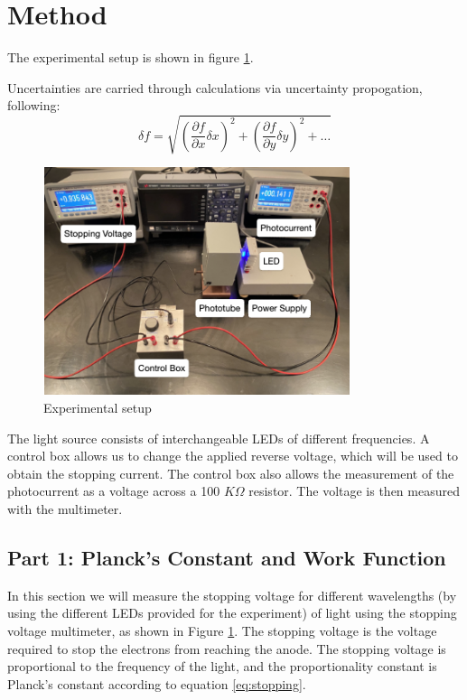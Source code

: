 \section{Method}

The experimental setup is shown in figure \ref{fig:setup}.

Uncertainties are carried through calculations via uncertainty propogation, following:
\begin{equation}
    \label{eq:uncertainty}
    \delta f = \sqrt{\left(\frac{\partial f}{\partial x}\delta x\right)^2 + \left(\frac{\partial f}{\partial y}\delta y\right)^2 + \ldots}
\end{equation}

\begin{figure}[H]
    \centering
    \includegraphics[width=0.8\textwidth]{method/setup.png}
    \caption{Experimental setup}
    \label{fig:setup}
\end{figure}

The light source consists of interchangeable LEDs of different frequencies. A control box allows us to change the applied reverse voltage, which will be used to obtain the stopping current.
The control box also allows the measurement of the photocurrent as a voltage across a 100 $K\Omega$ resistor. The voltage is then measured with the multimeter.

\subsection{Part 1: Planck's Constant and Work Function}

In this section we will measure the stopping voltage for different wavelengths (by using the different LEDs provided for the experiment) of light using the stopping voltage multimeter, as shown in Figure \ref{fig:setup}.
The stopping voltage is the voltage required to stop the electrons from reaching the anode.
The stopping voltage is proportional to the frequency of the light, and the proportionality constant is Planck's constant according to equation \ref{eq:stopping}.

